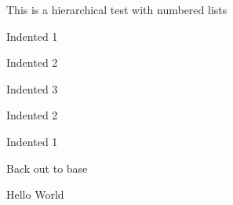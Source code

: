 \documentclass[letterpaper,portrait,12pt]{article}
\begin{document}
\setlength{\oddsidemargin}{0.7874in-1in}
\setlength{\textwidth}{\paperwidth - 0.7874in-0.7874in}

\begin{flushleft}
	This is a hierarchical test with numbered lists
\end{flushleft}


\begin{flushleft}
	Indented 1
\end{flushleft}


\begin{flushleft}
	Indented 2
\end{flushleft}


\begin{flushleft}
	Indented 3
\end{flushleft}


\begin{flushleft}
	Indented 2
\end{flushleft}


\begin{flushleft}
	Indented 1
\end{flushleft}


\begin{flushleft}
	Back out to base
\end{flushleft}


\begin{flushleft}
	Hello World
\end{flushleft}
\end{document}
